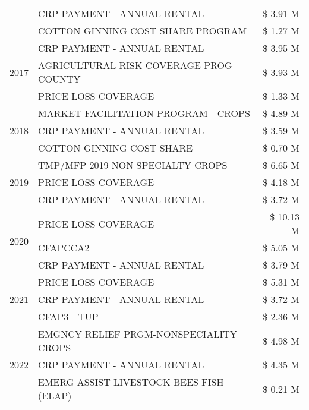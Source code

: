 \begin{tabular}{llr}
 & CRP PAYMENT - ANNUAL RENTAL & \$ 3.91 M \\
 & COTTON GINNING COST SHARE PROGRAM & \$ 1.27 M \\
\cline{1-3}
\multirow[t]{3}{*}{2017} & CRP PAYMENT - ANNUAL RENTAL & \$ 3.95 M \\
 & AGRICULTURAL RISK COVERAGE PROG - COUNTY & \$ 3.93 M \\
 & PRICE LOSS COVERAGE & \$ 1.33 M \\
\cline{1-3}
\multirow[t]{3}{*}{2018} & MARKET FACILITATION PROGRAM - CROPS & \$ 4.89 M \\
 & CRP PAYMENT - ANNUAL RENTAL & \$ 3.59 M \\
 & COTTON GINNING COST SHARE & \$ 0.70 M \\
\cline{1-3}
\multirow[t]{3}{*}{2019} & TMP/MFP 2019 NON SPECIALTY CROPS & \$ 6.65 M \\
 & PRICE LOSS COVERAGE & \$ 4.18 M \\
 & CRP PAYMENT - ANNUAL RENTAL & \$ 3.72 M \\
\cline{1-3}
\multirow[t]{3}{*}{2020} & PRICE LOSS COVERAGE & \$ 10.13 M \\
 & CFAPCCA2 & \$ 5.05 M \\
 & CRP PAYMENT - ANNUAL RENTAL & \$ 3.79 M \\
\cline{1-3}
\multirow[t]{3}{*}{2021} & PRICE LOSS COVERAGE & \$ 5.31 M \\
 & CRP PAYMENT - ANNUAL RENTAL & \$ 3.72 M \\
 & CFAP3 - TUP & \$ 2.36 M \\
\cline{1-3}
\multirow[t]{3}{*}{2022} & EMGNCY RELIEF PRGM-NONSPECIALITY CROPS & \$ 4.98 M \\
 & CRP PAYMENT - ANNUAL RENTAL & \$ 4.35 M \\
 & EMERG ASSIST LIVESTOCK BEES FISH (ELAP) & \$ 0.21 M \\
\cline{1-3}
\bottomrule
\end{tabular}
